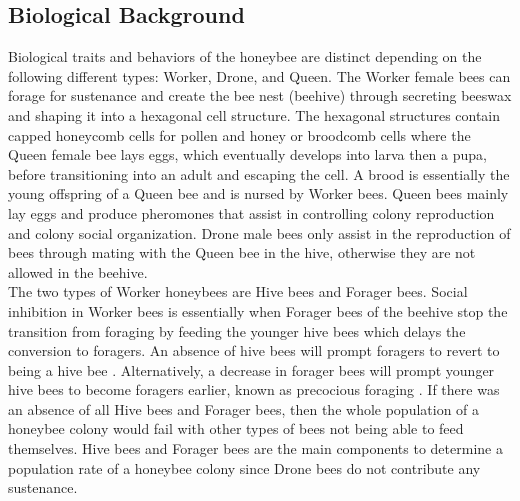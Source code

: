 \documentclass[a4paper,10pt]{article}
\begin{document}
\subsection{Biological Background}
Biological traits and behaviors of the honeybee are distinct depending on the
following different types: Worker, Drone, and Queen. The Worker female bees can
forage for sustenance and create the bee nest (beehive) through secreting beeswax
and shaping it into a hexagonal cell structure. The hexagonal structures contain
capped honeycomb cells for pollen and honey or broodcomb cells where the Queen
female bee lays eggs, which eventually develops into larva then a pupa, before
transitioning into an adult and escaping the cell. A brood is essentially the
young offspring of a Queen bee and is nursed by Worker bees. Queen bees mainly
lay eggs and produce pheromones that assist in controlling colony reproduction
and colony social organization. Drone male bees only assist in the reproduction
of bees through mating with the Queen bee in the hive, otherwise they are not
allowed in the beehive.\\
The two types of Worker honeybees are Hive bees and Forager bees. Social
inhibition in Worker bees is essentially when Forager bees of the beehive stop
the transition from foraging by feeding the younger hive bees which delays the
conversion to foragers. An absence of hive bees will prompt foragers to
revert to being a hive bee \cite{Brown}. Alternatively, a decrease in forager bees will
prompt younger hive bees to become foragers earlier, known as precocious foraging
\cite{Brown}. If there was an absence of all Hive bees and Forager bees, then the whole
population of a honeybee colony would fail with other types of bees not being
able to feed themselves. Hive bees and Forager bees are the main components to
determine a population rate of a honeybee colony since Drone bees do not
contribute any sustenance.
\end{document}
